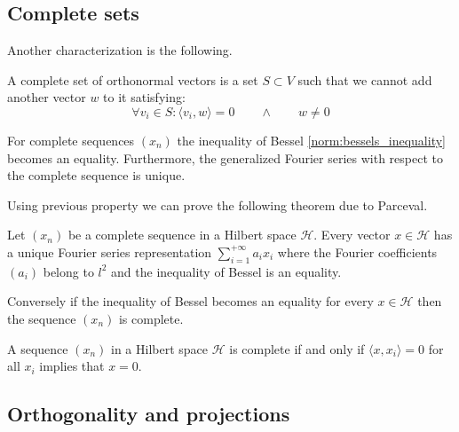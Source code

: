 \subsection{Complete sets}

	Another characterization is the following.
	\begin{adefinition}
		A complete set of orthonormal vectors is a set $S\subset V$ such that we cannot add another vector $w$ to it satisfying:
		\begin{equation}
			\forall v_i\in S: \langle v_i, w\rangle = 0\qquad\land\qquad  w\neq0
		\end{equation}
	\end{adefinition}
	
	\begin{property}
		For complete sequences $(x_n)$ the inequality of Bessel \ref{norm:bessels_inequality} becomes an equality. Furthermore, the generalized Fourier series with respect to the complete sequence is unique.
	\end{property}
	
	Using previous property we can prove the following theorem due to Parceval.
	\begin{theorem}[Parceval]
		Let $(x_n)$ be a complete sequence in a Hilbert space $\mathcal{H}$. Every vector $x\in\mathcal{H}$ has a unique Fourier series representation $\sum_{i=1}^{+\infty}a_ix_i$ where the Fourier coefficients $(a_i)$ belong to $l^2$ and the inequality of Bessel is an equality.
		
		Conversely if the inequality of Bessel becomes an equality for every $x\in\mathcal{H}$ then the sequence $(x_n)$ is complete.
	\end{theorem}
	
	\begin{property}
		A sequence $(x_n)$ in a Hilbert space $\mathcal{H}$ is complete if and only if $\langle x, x_i\rangle = 0$ for all $x_i$ implies that $x=0$.
	\end{property}

\subsection{Orthogonality and projections}

